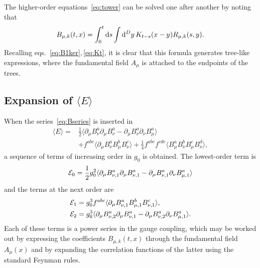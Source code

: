 The higher-order equations~\eqref{eq:tower} can be solved one after another
by noting that
\begin{equation}
   B_{\mu,k}(t,x)=\int_0^t\mathrm{d} s\int\mathrm{d}^Dy\,K_{t-s}(x-y)R_{\mu,k}(s,y).
   \label{eq:Bksol}
\end{equation}
Recalling eqs.~\eqref{eq:B1ker},\,\eqref{eq:Kt}, it is clear that this
formula generates tree-like expressions, where the fundamental field
$A_{\mu}$ is attached to the endpoints of the trees.

\subsection{Expansion of $\langle E\rangle$}

When the series~\eqref{eq:Bseries} is inserted in
\begin{equation}
\begin{split}
  \langle E\rangle={}&
           \frac{1}{2}\langle\partial_{\mu}B^a_{\nu}\partial_{\mu}B^a_{\nu}-
           \partial_{\mu}B^a_{\nu}\partial_{\nu}B^a_{\mu}\rangle\\
  &+f^{abc}\langle\partial_{\mu}B^a_{\nu}B^b_{\mu}B^c_{\nu}\rangle
           +\frac{1}{4}f^{abe}f^{cde}\langle
           B^a_{\mu}B^b_{\nu}B^c_{\mu}B^d_{\nu}\rangle,
\end{split}
\label{eq:Eexpansion}
\end{equation}
a sequence of terms of increasing order in $g_0$ is obtained.
The lowest-order term is
\begin{equation}
  {\cal E}_0=\frac{1}{2}g_0^2
             \langle\partial_{\mu}B^a_{\nu,1}\partial_{\mu}B^a_{\nu,1}-
             \partial_{\mu}B^a_{\nu,1}\partial_{\nu}B^a_{\mu,1}\rangle
  \label{eq:E0def}
\end{equation}
and the terms at the next order are
\begin{align}
  {\cal E}_1&=g_0^3
    f^{abc}\langle\partial_{\mu}B^a_{\nu,1}B^b_{\mu,1}B^c_{\nu,1}\rangle,
  \\
  {\cal E}_2&=
    g_0^3
    \langle\partial_{\mu}B^a_{\nu,2}\partial_{\mu}B^a_{\nu,1}-
           \partial_{\mu}B^a_{\nu,2}\partial_{\nu}B^a_{\mu,1}\rangle.
  \label{eq:E2def}
\end{align}
Each of these terms is a power series in the gauge coupling,
which may be worked out by expressing the
coefficients $B_{\mu,k}(t,x)$ through the fundamental
field $A_{\mu}(x)$ and by expanding
the correlation functions of the latter using
the standard Feynman rules.

